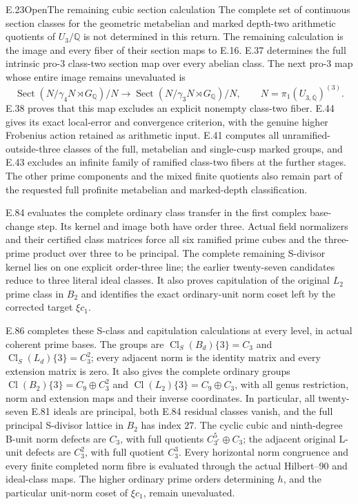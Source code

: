 \begin{statement}{E.23}{Open}{The remaining cubic section calculation}
The complete set of continuous section classes for the geometric
metabelian and marked depth-two arithmetic quotients of
$U_3/\mathbb Q$ is not determined in this return. The remaining
calculation is the image and every fiber of their section maps
to E.16. E.37 determines the full intrinsic pro-$3$ class-two
section map over every abelian class. The next pro-$3$ map whose
entire image remains unevaluated is
\[
 \operatorname{Sect}(N/\gamma_4N\rtimes G_{\mathbb Q})/N
 \longrightarrow
 \operatorname{Sect}(N/\gamma_3N\rtimes G_{\mathbb Q})/N,
 \qquad N=\pi_1(U_{3,\overline{\mathbb Q}})^{(3)}.
\]
E.38 proves that this map excludes an explicit nonempty
class-two fiber. E.44 gives its exact local-error and
convergence criterion, with the genuine higher Frobenius
action retained as arithmetic input. E.41 computes all
unramified-outside-three classes of the full, metabelian
and single-cusp marked groups, and E.43 excludes an infinite
family of ramified class-two fibers at the further stages.
The other prime components and the mixed
finite quotients also remain part of the requested full
profinite metabelian and marked-depth classification.

E.84 evaluates the complete ordinary class transfer in the first
complex base-change step. Its kernel and image both have order three.
Actual field normalizers and their certified class matrices force
all six ramified prime cubes and the three-prime product over three
to be principal. The complete remaining S-divisor kernel lies on
one explicit order-three line; the earlier twenty-seven candidates
reduce to three literal ideal classes. It also proves capitulation
of the original $L_2$ prime class in $B_2$ and identifies the exact
ordinary-unit norm coset left by the corrected target $\xi c_1$.


E.86 completes these S-class and capitulation calculations at every
level, in actual coherent prime bases. The groups are
\(\operatorname{Cl}_S(B_d)\{3\}=C_3\) and
\(\operatorname{Cl}_S(L_d)\{3\}=C_3^2\); every adjacent norm
is the identity matrix and every extension matrix is zero.
It also gives the complete ordinary groups
\(\operatorname{Cl}(B_2)\{3\}=C_9\oplus C_3^2\) and
\(\operatorname{Cl}(L_2)\{3\}=C_9\oplus C_3\), with all
genus restriction, norm and extension maps and their inverse
coordinates. In particular, all twenty-seven E.81 ideals are
principal, both E.84 residual classes vanish, and the full
principal S-divisor lattice in \(B_2\) has index \(27\).
The cyclic cubic and ninth-degree B-unit norm defects are
\(C_3\), with full quotients \(C_{3^r}^{5}\oplus C_3\);
the adjacent original L-unit defects are \(C_3^2\), with full
quotient \(C_3^3\). Every horizontal norm congruence and every
finite completed norm fibre is evaluated through the actual
Hilbert--90 and ideal-class maps. The higher ordinary prime
orders determining \(h\), and the particular unit-norm coset
of \(\xi c_1\), remain unevaluated.


\end{statement}
